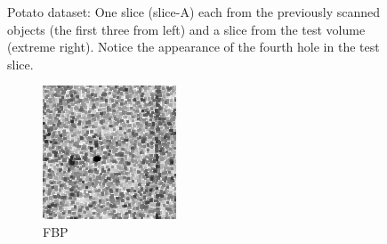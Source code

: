 \documentclass[journal]{IEEEtran}
\begin{document}
\begin{figure}[!h]
\begin{subfigure}[b]{0.235\linewidth}
\captionsetup{labelformat=empty}
        \caption{}
\label{fig:potato_test}
     \end{subfigure}
      \caption{Potato dataset: One slice (slice-A) each from the previously scanned objects (the first three from left) and a slice from the test 
        volume (extreme right). Notice the appearance of the fourth
        hole in the test slice. }
\label{fig:object-prior_test_potato_A1}
\end{figure}

\begin{figure}[!h]
    \begin{subfigure}[b]{0.24\linewidth}
        \includegraphics[width=\textwidth]{../images/potato/2D/weightsIm_fbp30.png}
        \caption{FBP}
    \end{subfigure}
    \begin{subfigure}[b]{0.24\linewidth}

\end{subfigure}
\end{figure}
\end{document}
